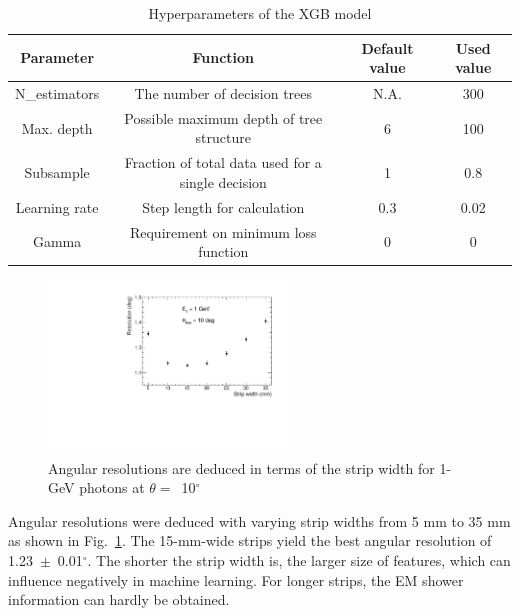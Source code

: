 \documentclass[preprint,12pt,times,a4paper]{elsarticle}
\begin{document}
\begin{table}[hbt!]{\small
\centering
\caption{Hyperparameters of the XGB model}
\begin{tabular}{cccc}
\hline 
Parameter & Function & Default value & Used value \\ \hline 
N\_estimators & The number of decision trees & N.A. & 300 \\  
Max. depth & Possible maximum depth of tree structure & 6 & 100 \\ 
Subsample & Fraction of total data used for a single decision & 1 & 0.8 \\ 
Learning rate & Step length for calculation & 0.3 & 0.02 \\ 
Gamma & Requirement on minimum loss function & 0 & 0 \\ 
\hline
\end{tabular}
\label{tab:XgbPar}
}\end{table}

\begin{figure}[!hbt]
\centering
\includegraphics[width=0.58\textwidth]{figures/Fig5_width.pdf}
\caption{ Angular resolutions are deduced in terms of the strip width for 1-GeV photons at $\theta=$~10$^{\circ}$ }
\label{fig:angle_reco_width}
\end{figure}

Angular resolutions were deduced with varying strip widths from 5 mm to 35 mm as shown in Fig.~\ref{fig:angle_reco_width}. The 15-mm-wide strips yield the best angular resolution of 1.23~$\pm$~0.01$^{\circ}$. The shorter the strip width is, the larger size of features, which can influence negatively in machine learning. For longer strips, the EM shower information can hardly be obtained.
\end{document}
